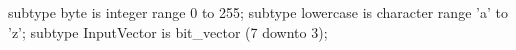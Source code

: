 subtype byte is integer range 0 to 255;
subtype lowercase is character range 'a' to 'z';
subtype InputVector is bit_vector (7 downto 3);